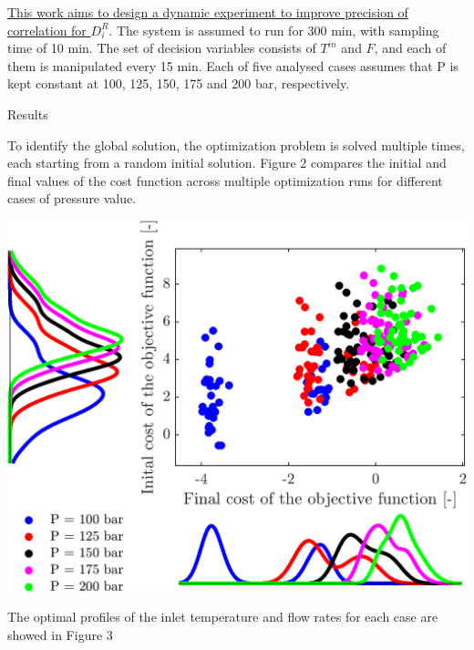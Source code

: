 \documentclass[a0,portrait]{a0poster}
\begin{document}
\begin{multicols}{2}
\begin{tcolorbox}[width=\linewidth, boxrule=0mm, sharp corners=all, colback=white]
\underline{This work aims to design a dynamic experiment to improve precision of correlation for $D_i^R$}. The system is assumed to run for 300 min, with sampling time of 10 min. The set of decision variables consists of $T^{in}$ and $F$, and each of them is manipulated every 15 min. Each of five analysed cases assumes that P is kept constant at 100, 125, 150, 175 and 200 bar, respectively.
\end{tcolorbox}
\begin{tcolorbox}[width=\linewidth, boxrule=0mm, sharp corners=all, colback=white]
	{\LARGE Results\\}

	To identify the global solution, the optimization problem is solved multiple times, each starting from a random initial solution. Figure 2 compares the initial and final values of the cost function across multiple optimization runs for different cases of pressure value.
	
	\begin{center}%
		\includegraphics[width=\linewidth]{scatter.png}
	\end{center}%
	
	The optimal profiles of the inlet temperature and flow rates for each case are showed in Figure 3
	

\end{tcolorbox}
\end{multicols}
\end{document}
